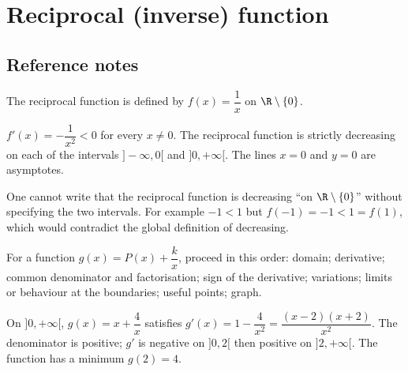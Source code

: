 
\chapter{Reciprocal (inverse) function}
\section{Reference notes}
The reciprocal function is defined by $f(x)=\dfrac1x$ on $\R\setminus\{0\}$.

\begin{center}
\end{center}

\begin{retenir}
$f'(x)=-\dfrac1{x^2}<0$ for every $x\neq0$. The reciprocal function is strictly decreasing on each of the intervals $]-\infty,0[$ and $]0,+\infty[$. The lines $x=0$ and $y=0$ are asymptotes.
\end{retenir}

\begin{erreur}
One cannot write that the reciprocal function is decreasing ``on $\R\setminus\{0\}$'' without specifying the two intervals. For example $-1<1$ but $f(-1)=-1<1=f(1)$, which would contradict the global definition of decreasing.
\end{erreur}

For a function $g(x)=P(x)+\dfrac{k}{x}$, proceed in this order: domain; derivative; common denominator and factorisation; sign of the derivative; variations; limits or behaviour at the boundaries; useful points; graph.

\begin{exemple}
On $]0,+\infty[$, $g(x)=x+\dfrac4x$ satisfies $g'(x)=1-\dfrac4{x^2}=\dfrac{(x-2)(x+2)}{x^2}$. The denominator is positive; $g'$ is negative on $]0,2[$ then positive on $]2,+\infty[$. The function has a minimum $g(2)=4$.
\end{exemple}

